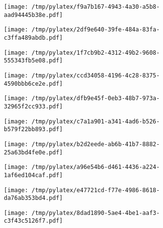 \documentclass{article}
\begin{document}
\begin{figure}[htbp]
\begin{subfigure}[b]{.3\linewidth}
\texttt{[image: /tmp/pylatex/f9a7b167-4943-4a30-a5b8-aad94445b38e.pdf]}
\end{subfigure}
\begin{subfigure}[b]{.3\linewidth}
\texttt{[image: /tmp/pylatex/2df9e640-39fe-484a-83fa-c3ffa489abdb.pdf]}
\end{subfigure}
\begin{subfigure}[b]{.3\linewidth}
\texttt{[image: /tmp/pylatex/1f7cb9b2-4312-49b2-9608-555343fb5e08.pdf]}
\end{subfigure}
\begin{subfigure}[b]{.3\linewidth}
\texttt{[image: /tmp/pylatex/ccd34058-4196-4c28-8375-4590bbb6ce2e.pdf]}
\end{subfigure}
\begin{subfigure}[b]{.3\linewidth}
\texttt{[image: /tmp/pylatex/dfb9e45f-0eb3-48b7-973a-32965f2cc933.pdf]}
\end{subfigure}
\begin{subfigure}[b]{.3\linewidth}
\texttt{[image: /tmp/pylatex/c7a1a901-a341-4ad6-b526-b579f22bb893.pdf]}
\end{subfigure}
\begin{subfigure}[b]{.3\linewidth}
\texttt{[image: /tmp/pylatex/b2d2eede-ab6b-41b7-8882-25a63bd4fe0e.pdf]}
\end{subfigure}
\begin{subfigure}[b]{.3\linewidth}
\texttt{[image: /tmp/pylatex/a96e54b6-d461-4436-a224-1af6ed104caf.pdf]}
\end{subfigure}
\begin{subfigure}[b]{.3\linewidth}
\texttt{[image: /tmp/pylatex/e47721cd-f77e-4986-8618-da76ab353bd4.pdf]}
\end{subfigure}
\begin{subfigure}[b]{.3\linewidth}
\texttt{[image: /tmp/pylatex/8dad1890-5ae4-4be1-aaf3-c3f43c5126f7.pdf]}
\end{subfigure}
\end{figure}
\end{document}
